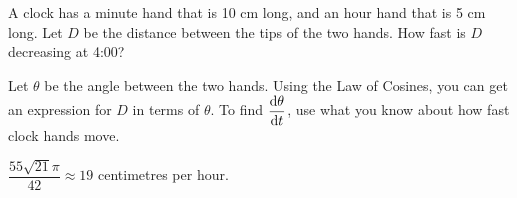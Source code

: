\begin{question}\label{s3.2triangleslast}
A clock has a minute hand that is 10 cm long, and an hour hand that is 5 cm long.
Let $D$ be the distance between the tips of the two hands. How fast is $D$ decreasing at 4:00?
\begin{center}\end{center}
\end{question}
\begin{hint}
Let $\theta$ be the angle between the two hands. Using the Law of Cosines, you can get an expression for $D$ in terms of $\theta$.  To find $\ds\diff{\theta}{t}$, use what you know about how fast clock hands move.
\end{hint}
\begin{answer}
$\dfrac{55\sqrt{21}\pi}{42}\approx 19$ centimetres per hour.
\end{answer}
